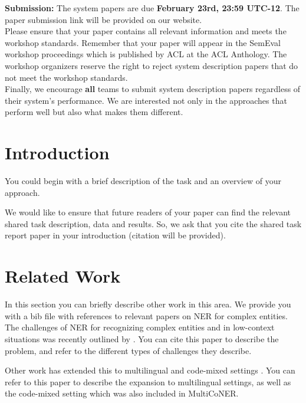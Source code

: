 \documentclass[11pt]{article}
\begin{document}
{\bf Submission:} The system papers are due {\bf February 23rd, 23:59 UTC-12}. The paper submission link will be provided on our website.
\\


Please ensure that your paper contains all relevant information and meets the workshop standards. Remember that your paper will appear in the SemEval workshop proceedings which is published by ACL at the ACL Anthology. The workshop organizers reserve the right to reject system description papers that do not meet the workshop standards.\\

Finally, we encourage {\bf all} teams to submit system description papers regardless of their system's performance. We are interested not only in the approaches that perform well but also what makes them different.\\

\section{Introduction}
\label{intro}

You could begin with a brief description of the task and an overview of your approach. 

We would like to ensure that future readers of your paper can find the relevant shared task description, data and results. So, we ask that you cite the shared task report paper in your introduction (citation will be provided).
\\

\section{Related Work}

In this section you can briefly describe other work in this area.
We provide you with a bib file with references to relevant papers on NER for complex entities.
\\


The challenges of NER for recognizing complex entities and in low-context situations was recently outlined by \citet{meng2021gemnet}. You can cite this paper to describe the problem, and refer to the different types of challenges they describe.


Other work has extended this to multilingual and code-mixed settings \cite{fetahu2021gazetteer}. You can refer to this paper to describe the expansion to multilingual settings, as well as the code-mixed setting which was also included in MultiCoNER.
\end{document}
